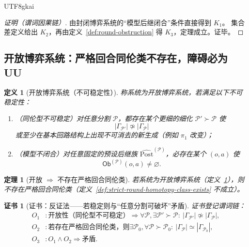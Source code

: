 \documentclass[12pt]{article}
\newtheorem{definition}{定义}[section]
\newtheorem{theorem}{定理}[section]
\newtheorem{Certificate}{证书}[section]
\begin{document}
\begin{CJK*}{UTF8}{gkai}
\begin{proof}[证明（谓词因果链）]
由封闭博弈系统的“模型后继闭合”条件直接得到 $K_1$。
集合差定义给出 $K_2$，再由定义~\ref{def:round-obstruction} 得 $K_3$，定理成立。证毕。
\end{proof}

\subsection{开放博弈系统：严格回合同伦类不存在，障碍必为 UU}
\label{sec:round-refinement-open}

\begin{definition}[开放博弈系统（不可稳定性）]
\label{def:open-game-system-round}
称系统为开放博弈系统，若满足以下不可稳定性：
\begin{enumerate}
  \item （同伦型不可稳定）对任意分割 $\mathcal{P}$，都存在某个更细的细化 $\mathcal{P}'\succ\mathcal{P}$ 使
  \[
    |\Gamma_{\mathcal{P}'}|\not\simeq |\Gamma_{\mathcal{P}}|
  \]
  或至少在基本回路结构上出现不可消去的新生成（例如 $\pi_1$ 改变）；
  \item （模型不闭合）对任意固定的预设后继族 $\widehat{\mathrm{Post}}^{(\mathcal{P})}$，必存在某个 $(o,a)$ 使
  \[
    \mathsf{Ob}^{(\mathcal{P})}(o,a)\neq\varnothing.
  \]
\end{enumerate}
\end{definition}

\begin{theorem}[开放 $\Rightarrow$ 不存在严格回合同伦类]
\label{thm:open-implies-no-strict-round-homotopy}
若系统为开放博弈系统（定义~\ref{def:open-game-system-round}），则不存在严格回合同伦类（定义~\ref{def:strict-round-homotopy-class-exists} 不成立）。
\end{theorem}

\begin{Certificate}[证书：反证法——若稳定则与“任意分割可破坏”矛盾]
\label{cert:open-implies-no-strict-round-homotopy}
证书登记谓词链：
\[
\begin{aligned}
  O_1 &: \text{开放性（同伦型不可稳定）}\Rightarrow \forall \mathcal{P},\exists \mathcal{P}'\succ\mathcal{P}:\ |\Gamma_{\mathcal{P}'}
    |\not\simeq |\Gamma_{\mathcal{P}}|,\\
  O_2 &: \text{若存在严格回合同伦类，则}\exists\mathcal{P}_0,\forall \mathcal{P}\succ\mathcal{P}_0:\ |\Gamma_{\mathcal{P}}|\simeq
    |\Gamma_{\mathcal{P}_0}|,\\
  O_3 &: O_1\wedge O_2\Rightarrow \text{矛盾}.
\end{aligned}
\]
\end{Certificate}


\end{CJK*}
\end{document}
